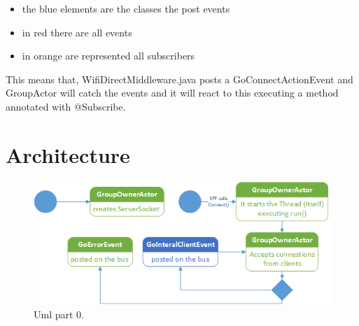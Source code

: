\begin{itemize}
	\item the blue elements are the classes the post events
	\item in red there are all events
	\item in orange are represented all subscribers
\end{itemize}

This means that, WifiDirectMiddleware.java posts a GoConnectActionEvent and GroupActor will catch the events and it will react to this executing a method annotated with @Subscribe.

\section{Architecture}

\begin{figure}[thpb]
	\centering
	\includegraphics[scale=0.5]{./images/chap2/uml-parte0-2.png}
	\caption{Uml part 0.}
	\label{uml-part0-2}
\end{figure}	

